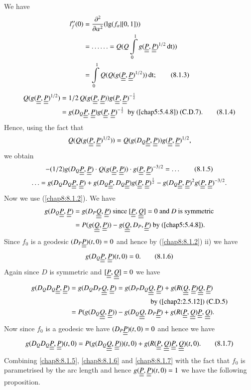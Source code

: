 We have
\begin{align*}
l''_{f}(0)&=\frac{\partial^{2}}{\partial\alpha^{2}}(\lg(f_{\alpha}|[0,1]))\\
&=\ldots
\ldots=Q(Q\int\limits^{1}_{0}g(\uub{P},\uub{P})^{1/2}\dt))\\
&=\int\limits^{1}_{0}Q(Q(g(\uub{P},\uub{P})^{1/2}))\dt;\tag{8.1.3}\label{chap8:8.1.3}
\end{align*}
\begin{align*}
Q(g(\uub{P},\uub{P})^{1/2})&=1/2\,
Q(g(\uub{P},\uub{P}))g(\uub{P},\uub{P})^{-\frac{1}{2}}\\
&=g(D_{Q}\uub{P},\uub{P})g(\uub{P},\uub{P})^{-\frac{1}{2}}\text{
  \ by (\ref{chap5:5.4.8}) (C.D.7).}\tag{8.1.4}\label{chap8:8.1.4}
\end{align*}
Hence, using the fact that
$$
Q(Q(g(\uub{P},\uub{P})^{1/2}))=Q(g(D_{Q}\uub{P},\uub{P}))g(\uub{P},\uub{P})^{1/2}, 
$$
we obtain
\begin{gather*}
-(1/2)g(D_{Q}\uub{P},\uub{P})\cdot Q(g(\uub{P},\uub{P}))\cdot
g(\uub{P},\uub{P})^{-3/2}=\ldots\tag{8.1.5}\label{chap8:8.1.5}\\
\ldots=g(D_{Q}D_{Q}\uub{P},\uub{P})+g(D_{Q}\uub{P},D_{Q}\uub{P})g(\uub{P},\uub{P})^{\frac{1}{2}}-g(D_{Q}\uub{P},\uub{P})^{2}g(\uub{P},\uub{P})^{-3/2}. 
\end{gather*}
Now we use (\ref{chap8:8.1.2}). We have
\begin{align*}
g(D_{Q}\uub{P},\uub{P}) &= g(D_{P}\uub{Q},\uub{P})\text{ since }
[\uub{P},\uub{Q}]=0\text{ and } D \text{ is symmetric}\\
&= P(g(\uub{Q},\uub{P}))-g(\uub{Q},D_{P},\uub{P})\text{ by (\ref{chap5:5.4.8}).} 
\end{align*}
Since $f_{0}$ is a geodesic $(D_{P}\uub{P})(t,0)=0$ and hence by
(\ref{chap8:8.1.2}) ii) we have
\begin{equation*}
g(D_{Q}\uub{P},\uub{P})(t,0)=0.\tag{8.1.6}\label{chap8:8.1.6} 
\end{equation*}
Again \pageoriginale since $D$ is symmetric and $[\uub{P},\uub{Q}]=0$
we have
\begin{align*}
g(D_{Q}D_{Q}\uub{P},\uub{P}) &=
g(D_{Q}D_{P}\uub{Q},\uub{P})=g(D_{P}D_{Q}\uub{Q},\uub{P})+g(R(\uub{Q},\uub{P})\uub{Q},\uub{P})\\
&\hspace{4cm} \text{ by (\ref{chap2:2.5.12}) (C.D.5)}\\
&=
P(g(D_{Q}\uub{Q},\uub{P}))-g(D_{Q}\uub{Q},D_{P}\uub{P})+g(R(\uub{P},\uub{Q})\uub{P},\uub{Q}). 
\end{align*}
Now since $f_{0}$ is a geodesic we have $(D_{P}\uub{P})(t,0)=0$ and
hence we have
\begin{equation*}
g(D_{Q}D_{Q}\uub{P},\uub{P})(t,0)=P(g(D_{Q}\uub{Q},\uub{P}))(t,0)+g(R(\uub{P},\uub{Q})\uub{P},\uub{Q})(t,0).\tag{8.1.7}\label{chap8:8.1.7} 
\end{equation*}
Combining \eqref{chap8:8.1.5}, \eqref{chap8:8.1.6} and \eqref{chap8:8.1.7} with the fact
that $f_{0}$ is parametri\-sed by the arc length and hence
$g(\uub{P},\uub{P})(t,0)=1$ we have the following proposition.

